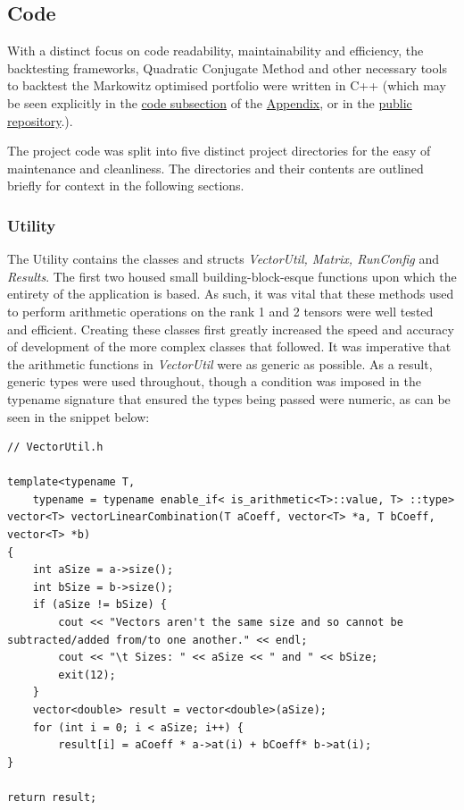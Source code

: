 \documentclass{article}
\begin{document}
\subsection{Code}
\label{sec:implementation_code}


With a distinct focus on code readability, maintainability and efficiency, the backtesting frameworks, Quadratic Conjugate Method and other necessary tools to backtest the Markowitz optimised portfolio were written in C++ (which may be seen explicitly in the  \hyperref[sec:code]{code subsection} of the \hyperref[sec:appendix]{Appendix}, or in the \href{https://github.com/indipanesar96/markowitzportfoliooptimiser}{public repository}.).


The project code was split into five distinct project directories for the easy of maintenance and cleanliness. The directories and their contents are outlined briefly for context in the following sections.

\subsubsection{Utility}
\label{sec:utility}

The Utility contains the classes and structs \textit{VectorUtil, Matrix, RunConfig} and \textit{Results}. 
The first two housed small building-block-esque functions upon which the entirety of the application is based. As such, it was vital that these methods used to perform arithmetic operations on the rank 1 and 2 tensors were well tested and efficient. Creating these classes first greatly increased the speed and accuracy of development of the more complex classes that followed.
It was imperative that the arithmetic functions in \textit{VectorUtil} were as generic as possible. As a result, generic types were used throughout, though a condition was imposed in the typename signature that ensured the types being passed were numeric, as can be seen in the snippet below:


\begin{lstlisting}
// VectorUtil.h

template<typename T,
	typename = typename enable_if< is_arithmetic<T>::value, T> ::type>
vector<T> vectorLinearCombination(T aCoeff, vector<T> *a, T bCoeff, vector<T> *b) 
{
	int aSize = a->size();
	int bSize = b->size();
	if (aSize != bSize) {
		cout << "Vectors aren't the same size and so cannot be subtracted/added from/to one another." << endl;
		cout << "\t Sizes: " << aSize << " and " << bSize;
		exit(12);
	}
	vector<double> result = vector<double>(aSize);
	for (int i = 0; i < aSize; i++) {
		result[i] = aCoeff * a->at(i) + bCoeff* b->at(i);
}

return result;
\end{lstlisting}
\end{document}
